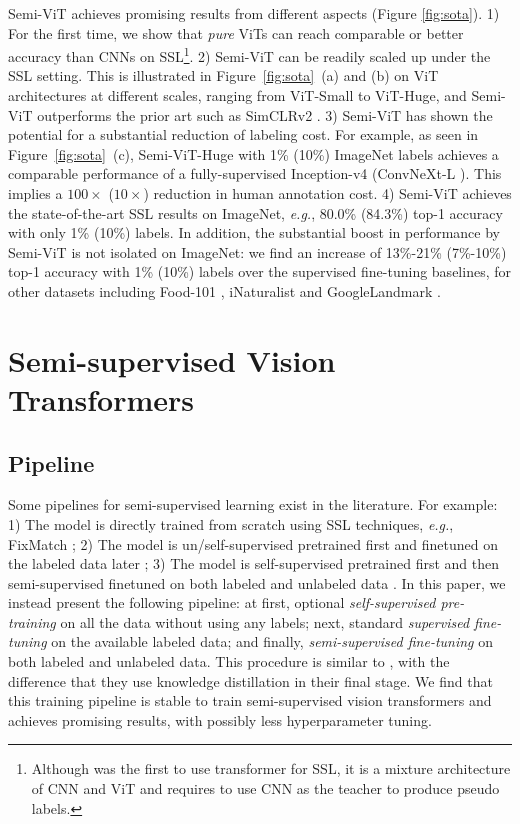 \documentclass{article}
\newcommand\eg{\emph{e.g.}}
\begin{document}
Semi-ViT achieves promising results from different aspects (Figure \ref{fig:sota}).
1) For the first time, we show that \emph{pure} ViTs can reach comparable or better accuracy than CNNs on SSL\footnote{Although \cite{weng2021semi} was the first to use transformer for SSL, it is a mixture architecture of CNN and ViT and requires to use CNN as the teacher to produce pseudo labels.}.
2) Semi-ViT can be readily scaled up under the SSL setting. 
This is illustrated in Figure~\ref{fig:sota}~(a) and (b) on ViT architectures at different scales, ranging from ViT-Small to ViT-Huge, and Semi-ViT outperforms the prior art such as SimCLRv2 \cite{DBLP:conf/nips/ChenKSNH20}. 3) Semi-ViT has shown the potential for a substantial reduction of labeling cost. For example, as seen in Figure~\ref{fig:sota}~(c), Semi-ViT-Huge with 1\% (10\%) ImageNet labels achieves a comparable performance of a fully-supervised Inception-v4 \cite{DBLP:conf/aaai/SzegedyIVA17} (ConvNeXt-L \cite{liu2022convnet}). This implies a $100\times$ ($10\times$) reduction in human annotation cost.
4) Semi-ViT achieves the state-of-the-art SSL results on ImageNet, \eg, 80.0\% (84.3\%) top-1 accuracy with only 1\% (10\%) labels. In addition, the substantial boost in performance by Semi-ViT is not isolated on ImageNet: we find an increase of 13\%-21\% (7\%-10\%) top-1 accuracy with 1\% (10\%) labels over the supervised fine-tuning baselines, for other datasets including Food-101 \cite{DBLP:conf/eccv/BossardGG14}, iNaturalist \cite{DBLP:journals/corr/HornASSAPB17} and GoogleLandmark \cite{DBLP:conf/iccv/NohASWH17}.


\section{Semi-supervised Vision Transformers}


\subsection{Pipeline}

Some pipelines for semi-supervised learning exist in the literature. For example:
1) The model is directly trained from scratch using SSL techniques, \eg, FixMatch \cite{DBLP:conf/nips/SohnBCZZRCKL20}; 
2) The model is un/self-supervised pretrained first and finetuned on the labeled data later \cite{DBLP:conf/cvpr/He0WXG20,DBLP:conf/icml/ChenK0H20,DBLP:conf/nips/GrillSATRBDPGAP20}; 
3) The model is self-supervised pretrained first and then semi-supervised finetuned on both labeled and unlabeled data \cite{DBLP:conf/cvpr/CaiRMFTS21}. 
In this paper, we instead present the following pipeline: at first, optional \emph{self-supervised pre-training} on all the data without using any labels; next, standard \emph{supervised fine-tuning} on the available labeled data; and finally, \emph{semi-supervised fine-tuning} on both labeled and unlabeled data. This procedure is similar to \cite{DBLP:conf/nips/ChenKSNH20}, with the difference that they use knowledge distillation \cite{DBLP:journals/corr/HintonVD15} in their final stage. We find that this training pipeline is stable to train semi-supervised vision transformers and achieves promising results, with possibly less hyperparameter tuning.  
\end{document}
